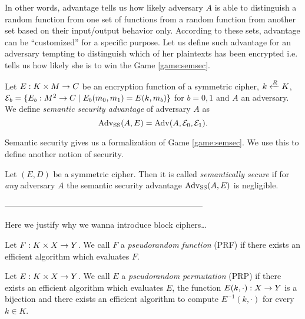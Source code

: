 In other words, advantage tells us how likely adversary $A$ is able to distinguish a random function from one set of functions from a random function from another set based on their input/output behavior only. According to these sets, advantage can be ``customized'' for a specific purpose. Let us define such advantage for an adversary tempting to distinguish which of her plaintexts has been encrypted i.e. tells us how likely she is to win the Game \ref{game:semsec}.

\begin{defn}
\label{def:ssadvant}
	Let $E: K\times M\rightarrow C$ be an encryption function of a symmetric cipher, $k\xleftarrow{R} K$, ${\cal E}_b = \{E_b:M^2\rightarrow C \mid E_b(m_0,m_1) = E(k,m_b)\}$ for $b=0,1$ and $A$ an adversary. We define {\em semantic security advantage} of adversary $A$ as
	\[
		\operatorname*{Adv_{SS}}(A,E) = \operatorname*{Adv}(A,{\cal E}_0,{\cal E}_1) .
	\]
\end{defn}

Semantic security gives us a formalization of Game \ref{game:semsec}. We use this to define another notion of security.

\begin{defn}
\label{def:semsec}
	Let $(E,D)$ be a symmetric cipher. Then it is called {\em semantically secure} if for {\em any} adversary $A$ the semantic security advantage $\operatorname*{Adv_{SS}}(A,E)$ is negligible.
\end{defn}



------------------------------------------------------------------------


Here we justify why we wanna introduce block ciphers\ldots

\begin{defn}   %
	Let $F: K\times X\rightarrow Y$. We call $F$ a {\em pseudorandom function} (PRF) if there exists an efficient algorithm which evaluates $F$.
\end{defn}

\begin{defn}
	Let $E: K\times X\rightarrow Y$. We call $E$ a {\em pseudorandom permutation} (PRP) if there exists an efficient algorithm which evaluates $E$, the function $E(k,\cdot): X\rightarrow Y$ is a bijection and there exists an efficient algorithm to compute $E^{-1}(k,\cdot)$ for every $k\in K$.
\end{defn}

